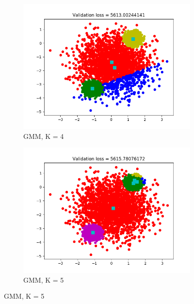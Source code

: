 \documentclass[12pt,letterpaper]{article}
\begin{document}
\begin{figure}
    \begin{subfigure}[b]{0.45\textwidth}
        \includegraphics[width=\textwidth]{imgs/GMM_K_4.png}
        \caption{GMM, K = 4}
        \label{GMM_4}
    \end{subfigure}
    \begin{subfigure}[b]{0.45\textwidth}
        \includegraphics[width=\textwidth]{imgs/GMM_K_5.png}
        \caption{GMM, K = 5}
        \label{GMM_5}
    \end{subfigure}
\end{figure}
\end{document}
